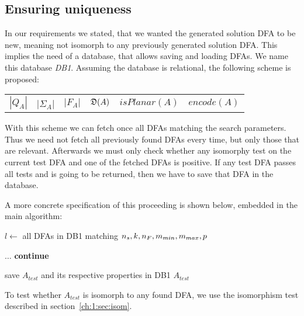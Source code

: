 \subsection{Ensuring uniqueness}

In our requirements we stated, that we wanted the generated solution DFA to be new, meaning not isomorph to any previously generated solution DFA. This implies the need of a database, that allows saving and loading DFAs. We name this database \emph{DB1}. Assuming the database is relational, the following scheme is proposed:
\begin{center}
	\begin{tabular}{c c c c c c}
	$|Q_A|$ & |$\Sigma_A$| & $|F_A|$ & $\mathfrak{D}(A)$ & $isPlanar(A)$ & $encode(A)$
	\end{tabular}
\end{center}
With this scheme we can fetch once all DFAs matching the search parameters. Thus we need not fetch all previously found DFAs every time, but only those that are relevant. Afterwards we must only check whether any isomorphy test on the current test DFA and one of the fetched DFAs is positive. If any test DFA passes all tests and is going to be returned, then we have to save that DFA in the database.

A more concrete specification of this proceeding is shown below, embedded in the main algorithm:
\vspace{0.2cm}
\begin{algorithmic}[1]
	
		\vspace{0.2cm}
	
		\State $l \gets$ all DFAs in DB1 matching ${n_s}, k, {n_F}, m_{min}, m_{max}, p$
		
		\vspace{0.2cm}
		
		
		\vspace{0.2cm}
		
			\State $\ldots$
				\State \textbf{continue}
			\EndIf
			
			\vspace{0.2cm}
			
			\State save $A_{test}$ and its respective properties in DB1
			\State\Return $A_{test}$
		\EndWhile
	\EndFunction
\end{algorithmic}
\vspace{0.2cm}
To test whether $A_{test}$ is isomorph to any found DFA, we use the isomorphism test described in section~\ref{ch:1:sec:isom}.

